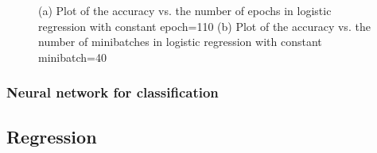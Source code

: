 \documentclass[../main.tex]{subfiles}
\begin{document}
\begin{figure}[H]
\begin{subfigure}[b]{0.45\textwidth}
    \caption{}
    \label{fig:accvsmini}
   \end{subfigure}
   \caption{(a) Plot of the accuracy vs. the number of epochs in logistic regression with constant epoch=110 (b) Plot of the accuracy vs. the number of minibatches in logistic regression with constant minibatch=40
   }
   \label{fig:terrain-OLS}
\end{figure} 


\subsubsection{Neural network for classification}

\subsection{Regression}
\end{document}
